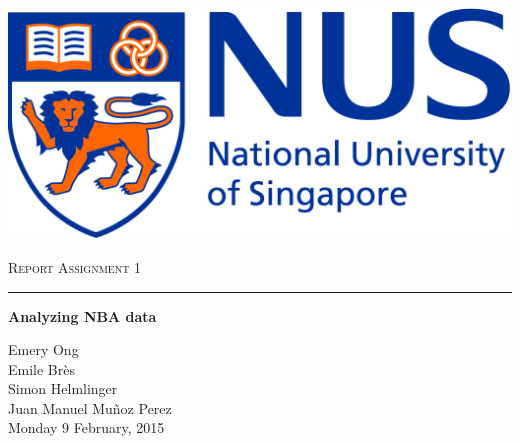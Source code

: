
\begin{center}
	\begin{flushleft}
		\includegraphics[scale=0.1]{images/NUS.jpg}
		
	\end{flushleft}
	
	
	\vskip 5cm
	{\LARGE\textsc{Report Assignment 1}}\\
	\noindent\rule{4cm}{0.2pt}
	\vskip 0.5cm
	{\LARGE\textbf{Analyzing NBA data}}
	\vskip 4.5cm
	
	\LARGE{Emery Ong}\\
	\LARGE{Emile Br\`es}\\
	\LARGE{Simon Helmlinger}\\
	\LARGE{Juan Manuel Mu\~noz Perez}\\
	
	\vspace{1.0cm}
	\Large{Monday 9 February, 2015}
	
	\vspace{2.cm}
	
\end{center}

